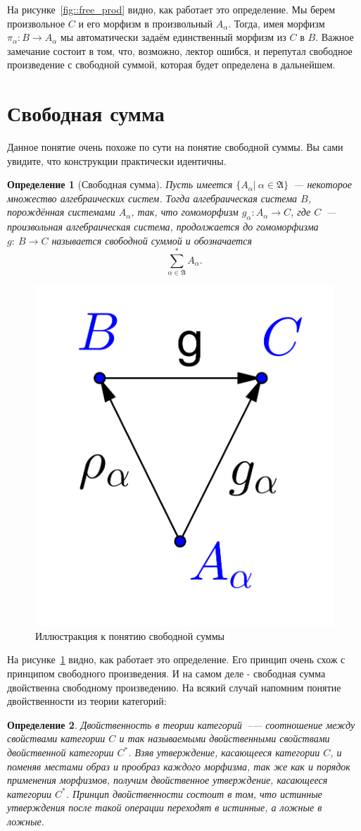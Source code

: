 \documentclass[a4paper, 12pt]{report}
\newtheorem{definition}{Определение}[chapter]
\begin{document}
На рисунке~\ref{fig::free_prod} видно, как работает это определение. Мы берем произвольное $C$ и его морфизм в произвольный $A_{\alpha}$. Тогда, имея морфизм $\pi_{\alpha}: B\rightarrow A_{\alpha}$ мы автоматически задаём единственный морфизм из $C$ в $B$. Важное замечание состоит в том, что, возможно, лектор ошибся, и перепутал свободное произведение с свободной суммой, которая будет определена в дальнейшем.

\section{Свободная сумма}
Данное понятие очень похоже по сути на понятие свободной суммы. Вы сами увидите, что конструкции практически идентичны.

\begin{definition}[Свободная сумма]
Пусть имеется $\{A_{\alpha}|\ \alpha\in\mathfrak{A}\}$~--- некоторое множество алгебраических систем. Тогда алгебраическая система $B$, порождённая системами $A_{\alpha}$, так, что гомоморфизм $g_{\alpha}: A_{\alpha} \rightarrow C$, где $C$~--- произвольная алгебраическая система, продолжается до гомоморфизма $g:\ B\rightarrow C$ называется свободной суммой и обозначается \[
\sum^*_{\alpha\in\mathfrak{A}} A_{\alpha}.
\]
\end{definition}

\begin{figure}[htbp]
\centering
\includegraphics[width=0.3\linewidth]{lect3/FreeSum.png}
\caption{Иллюстракция к понятию свободной суммы}
\label{fig::free_sum}
\end{figure}

На рисунке~\ref{fig::free_sum} видно, как работает это определение. Его принцип очень схож с принципом свободного произведения. И на самом деле - свободная сумма двойственна свободному произведению. На всякий случай напомним понятие двойственности из теории категорий:

\begin{definition}
Двойственность в теории категорий~--— соотношение между свойствами категории $C$ и так называемыми двойственными свойствами двойственной категории $C^*$. Взяв утверждение, касающееся категории $C$, и поменяв местами образ и прообраз каждого морфизма, так же как и порядок применения морфизмов, получим двойственное утверждение, касающееся категории $C^*$. Принцип двойственности состоит в том, что истинные утверждения после такой операции переходят в истинные, а ложные в ложные.
\end{definition}
\end{document}
